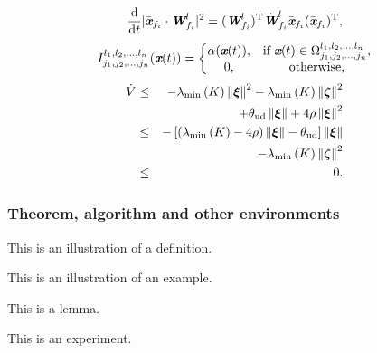 \documentclass[twoside,twocolumn]{article}
\begin{document}
\begin{equation}
{{\rm d} \over {{\rm d}t}}{|\bar {\emph{\textbf{x}}}_{f_i} \cdot {\emph{\textbf{W}}}_{f_i}^l |^2 }= ({{\emph{\textbf{W}}}_{f_i}^l})^{\rm T} \dot {\emph{\textbf{W}}}_{f_i}^l \bar {\emph{\textbf{x}}}_{f_i}({\bar {\emph{\textbf{x}}}_{f_i}})^{\rm T},
\end{equation}
\begin{equation}\label{indicatorfunc}
I_{{{j_{1}},{j_{2}},...,{j_{n}}}}^{{{l_{1}},{l_{2}},...,{l_{n}}}} (\emph{\textbf{x}}(t))= \left\{ \begin{matrix}\alpha(\emph{\textbf{x}}(t)), & {\mathrm{if}\:\emph{\textbf{x}}(t) \in\Omega_{{{j_{1}},{j_{2}},...,{j_{n}}}}^{{{l_{1}},{l_{2}},...,{l_{n}}}}},\cr 0, & {\mathrm{otherwise,}}\cr\end{matrix}\right.
\end{equation}
\begin{eqnarray}\label{eqn:Lyapdisturb1}
\dot V & \leq & - \lambda_{\rm min}\left( K \right) \left\| {\bm \xi} \right\|^2 - \lambda_{\rm min}\left( K \right) \left\| {\bm \zeta} \right\|^2  \nonumber\\
&& +\theta_{\rm ud} \left\| {\bm \xi} \right\| + 4 \rho \left\| {{\bm \xi} } \right\|^2 \nonumber\\
& \leq & - \left[ \left( \lambda_{\rm min}\left( K \right)- 4 \rho \right)\left\| {\bm \xi} \right\|  -  \theta_{\rm ud}  \right] \left\| {\bm \xi} \right\|  \nonumber\\
&& -\lambda_{\rm min}\left( K \right) \left\| {\bm \zeta} \right\|^2 \nonumber\\
&\leq& 0.
\end{eqnarray}


\subsubsection{Theorem, algorithm and other environments}

\begin{definition}
This is an illustration of a definition.
\end{definition}

\begin{example}
This is an illustration of an example.
\end{example}

\begin{lemma}
This is a lemma.
\end{lemma}

\begin{experiment}
This is an experiment.
\end{experiment}
\end{document}
